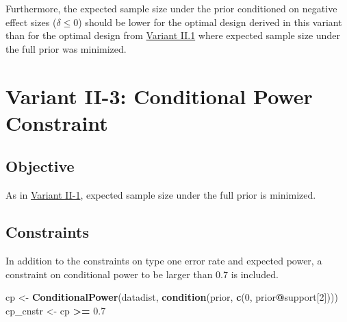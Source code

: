 \documentclass[]{book}
\newenvironment{Shaded}{\begin{snugshade}}{\end{snugshade}}
\newcommand{\DecValTok}[1]{\textcolor[rgb]{0.00,0.00,0.81}{#1}}
\newcommand{\FloatTok}[1]{\textcolor[rgb]{0.00,0.00,0.81}{#1}}
\newcommand{\KeywordTok}[1]{\textcolor[rgb]{0.13,0.29,0.53}{\textbf{#1}}}
\newcommand{\NormalTok}[1]{#1}
\newcommand{\OperatorTok}[1]{\textcolor[rgb]{0.81,0.36,0.00}{\textbf{#1}}}
\newcommand{\StringTok}[1]{\textcolor[rgb]{0.31,0.60,0.02}{#1}}
\begin{document}
Furthermore, the expected sample size under the prior conditioned on negative
effect sizes (\(\delta \leq 0\)) should be lower for the optimal design derived
in this variant than for the optimal design from \protect\hyperlink{variantII_1}{Variant II.1}
where expected sample size under the full prior was minimized.

\begin{Shaded}
\end{Shaded}

\hypertarget{variantII_3}{%
\section{Variant II-3: Conditional Power Constraint}\label{variantII_3}}

\hypertarget{objective-5}{%
\subsection{Objective}\label{objective-5}}

As in \protect\hyperlink{variantII_1}{Variant II-1}, expected sample size under the full prior
is minimized.

\hypertarget{constraints-5}{%
\subsection{Constraints}\label{constraints-5}}

In addition to the constraints on type one error rate and expected power,
a constraint on conditional power to be larger than \(0.7\) is included.

\begin{Shaded}
\begin{Highlighting}[]
\NormalTok{cp       <-}\StringTok{ }\KeywordTok{ConditionalPower}\NormalTok{(datadist, }\KeywordTok{condition}\NormalTok{(prior, }\KeywordTok{c}\NormalTok{(}\DecValTok{0}\NormalTok{, prior}\OperatorTok{@}\NormalTok{support[}\DecValTok{2}\NormalTok{])))}
\NormalTok{cp_cnstr <-}\StringTok{ }\NormalTok{cp }\OperatorTok{>=}\StringTok{ }\FloatTok{0.7}
\end{Highlighting}
\end{Shaded}
\end{document}
